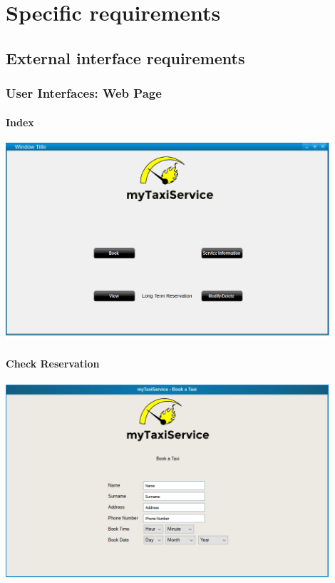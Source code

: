 \section{Specific requirements}
	\subsection{External interface requirements}
		\subsubsection{User Interfaces: Web Page}
		\paragraph{Index}
		\begin{center}
			\includegraphics[width=0.90\textwidth]{./images/index}
		\end{center}
		\paragraph{Check Reservation}
		\begin{center}
			\includegraphics[width=0.90\textwidth]{./images/check_reservation}
		\end{center}
